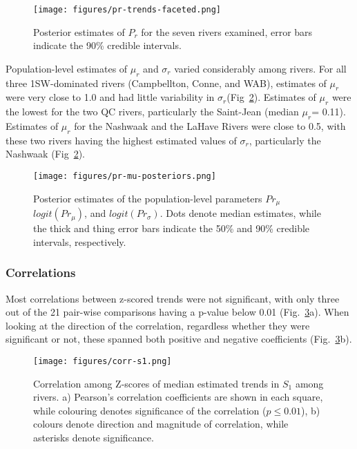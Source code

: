 \documentclass[12pt]{article}
\newcommand{\So}{$S_{1}$\xspace}
\newcommand{\Pg}{$P_r$\xspace}
\newcommand{\prmu}{$\mu_r$\xspace}
\newcommand{\prsig}{$\sigma_r$\xspace}
\begin{document}
\begin{figure}[htbp] \centering
    \texttt{[image: figures/pr-trends-faceted.png]}
    \caption{Posterior estimates of \Pg for the seven rivers examined, error
        bars indicate the 90\% credible intervals.} \label{fig:pr-faceted}
\end{figure}

Population-level estimates of \prmu and \prsig varied considerably among rivers. For all
three 1SW-dominated rivers (Campbellton, Conne, and WAB), estimates of \prmu
were very close to 1.0 and had little variability in \prsig (Fig~\ref{fig:prmu-post}).
Estimates of \prmu were the lowest for the two QC rivers, particularly the Saint-Jean (median \prmu = 0.11).
Estimates of \prmu for the Nashwaak and the LaHave Rivers were close to 0.5, with these two rivers having 
the highest estimated values of \prsig, particularly the Nashwaak (Fig~\ref{fig:prmu-post}).

\begin{figure}[htbp] \centering
    \texttt{[image: figures/pr-mu-posteriors.png]}
    \caption{Posterior estimates of the population-level parameters $Pr_{\mu}$
       $logit(Pr_{\mu})$, and $logit(Pr_{\sigma})$. Dots denote median estimates, while the thick and thing error bars indicate
       the 50\% and 90\% credible intervals, respectively.} 
   \label{fig:prmu-post} 
\end{figure}

\subsubsection*{Correlations}

Most correlations between z-scored trends were not significant, with only 
three out of the 21 pair-wise comparisons having a p-value below 0.01 (Fig.~\ref{fig:s1-corr}a).
When looking at the direction of the correlation, regardless whether they were
significant or not, these spanned both positive and negative coefficients
(Fig.~\ref{fig:s1-corr}b).

\begin{figure}[htbp] \centering
    \texttt{[image: figures/corr-s1.png]} \caption{
        Correlation among Z-scores of median estimated trends in \So among
        rivers. a) Pearson's correlation coefficients are shown in each square,
        while colouring denotes significance of the correlation ($p \leq 0.01$), b)
        colours denote direction and magnitude of correlation, while asterisks denote significance.}
\label{fig:s1-corr} 
\end{figure}
\end{document}
